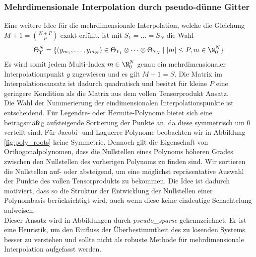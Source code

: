 \subsubsection*{Mehrdimensionale Interpolation durch pseudo-dünne Gitter}
Eine weitere Idee für die mehrdimensionale Interpolation, welche die Gleichung $M+1=\binom{N+P}{P}$ exakt erfüllt, ist mit $S_1=\dots=S_N$ die Wahl
\[\Theta_Y^N=\lbrace (y_{m_1},\dots,y_{m_N})\in \Theta_{Y_1}\otimes \dots \otimes \Theta_{Y_N} \mid |m|\le P,m\in\N_0^N \rbrace \]
Es wird somit jedem Multi-Index $m\in\N_0^N$ genau ein mehrdimensionaler Interpolationspunkt $y$ zugewiesen und es gilt $M+1=S$. Die Matrix im Interpolationsansatz ist dadurch quadratisch und besitzt für kleine $P$ eine geringere Kondition als die Matrix aus dem vollen Tensorprodukt Ansatz.\\[0.1cm]
Die Wahl der Nummerierung der eindimensionalen Interpolationspunkte ist entscheidend. Für Legendre- oder Hermite-Polynome bietet sich eine betragsmäßig aufsteigende Sortierung der Punkte an, da diese symmetrisch um $0$ verteilt sind. Für Jacobi- und Laguerre-Polynome beobachten wir in Abbildung \ref{fig:poly_roots} keine Symmetrie. Dennoch gilt die Eigenschaft von Orthogonalpolynomen, dass die Nullstellen eines Polynoms höheren Grades zwischen den Nullstellen des vorherigen Polynoms zu finden sind. Wir sortieren die Nullstellen auf- oder absteigend, um eine möglichst repräsentative Auswahl der Punkte des vollen Tensorprodukts zu bekommen. Die Idee ist dadurch motiviert, dass so die Struktur der Entwicklung der Nullstellen einer Polynombasis berücksichtigt wird, auch wenn diese keine eindeutige Schachtelung aufweisen.\\
Dieser Ansatz wird in Abbildungen durch \textit{pseudo\_sparse} gekennzeichnet. Er ist eine Heuristik, um den Einfluss der Überbestimmtheit des zu lösenden Systems besser zu verstehen und sollte nicht als robuste Methode für mehrdimensionale Interpolation aufgefasst werden.\\
